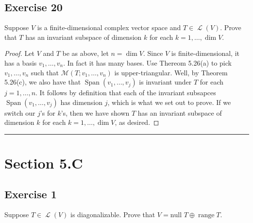 \documentclass[letterpaper, 12pt]{amsart}
\DeclareMathOperator{\Ell}{\mathscr{L}}				%
\renewcommand{\null}{\text{null }}					%
\DeclareMathOperator{\range}{\text{range }}			%
\DeclareMathOperator{\Span}{Span}					%
\theoremstyle{definition}  							%
\begin{document}
		\subsection*{Exercise 20}
		Suppose $V$ is a finite-dimensional complex vector space and $T \in \Ell(V)$. 
		Prove that $T$ has an invariant subspace of dimension $k$ for each $k = 1, \dots, \dim{V}$.
		\vspace*{3mm}

		\begin{proof}
		Let $V$ and $T$ be as above, let $n = \dim V$.
		Since $V$ is finite-dimensional, it has a basis $v_{1}, \dots, v_{n}$.
		In fact it has many bases.
		Use Thereom 5.26(a) to pick $v_{1}, \dots, v_{n}$ such that $\mathcal{M}(T; v_{1}, \dots, v_{n})$ is upper-triangular.
		Well, by Theorem 5.26(c), we also have that $\Span(v_{1}, \dots, v_{j})$ is invariant under $T$ for each $j = 1, \dots, n$.
		It follows by definition that each of the invariant subsapces $\Span(v_{1}, \dots, v_{j})$ has dimension $j$, which is what we set out to prove.
		If we switch our $j$'s for $k$'s, then we have shown $T$ has an invariant subspace of dimension $k$ for each $k = 1, \dots, \dim{V}$, as desired.
		\end{proof}
		\vspace*{2mm}
		\hrule
		\vspace*{2mm}

	\section*{Section 5.C}
		\subsection*{Exercise 1}
		Suppose $T \in \Ell(V)$ is diagonalizable. 
		Prove that $V = \null T \oplus \range T$.
		\vspace*{3mm}
\end{document}
